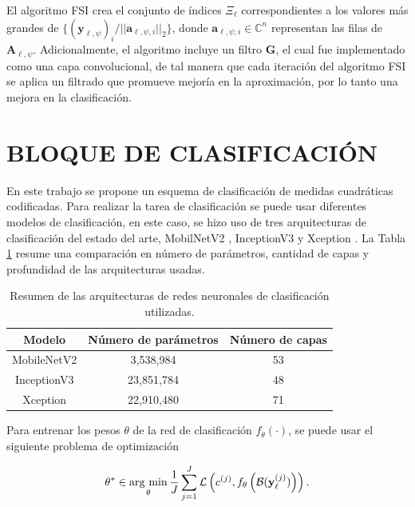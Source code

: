 El algoritmo FSI crea el conjunto de índices $\Xi_\ell$ correspondientes a los valores más grandes de $\{(\mathbf{y}_{\ell, \psi})_{i}/\vert \vert\mathbf{a}_{\ell, \psi,i}\vert \vert_2\}$, donde $\mathbf{a}_{\ell, \psi,i}\in\mathbb{C}^{n}$ representan las filas de $\mathbf{A}_{\ell, \psi}$. Adicionalmente, el algoritmo incluye un filtro $\mathbf{G}$, el cual fue implementado como una capa convolucional, de tal manera que cada iteración del algoritmo FSI se aplica un filtrado que promueve mejoría en la aproximación, por lo tanto una mejora en la clasificación. 


\section{BLOQUE DE CLASIFICACIÓN}

En este trabajo se propone un esquema de clasificación de medidas cuadráticas codificadas. Para realizar la tarea de clasificación se puede usar diferentes modelos de clasificación, en este caso, se hizo uso de tres arquitecturas de clasificación del estado del arte, MobilNetV2 , InceptionV3   y Xception . La Tabla \ref{tab:comp_class_models} resume una comparación en número de parámetros, cantidad de capas y profundidad de las arquitecturas usadas.

\begin{table}[!h]
\centering
\begin{tabular}{|c|c|c|}
\hline
\textbf{Modelo}      & \textbf{Número de parámetros} & \textbf{Número de capas} \\ \hline
MobileNetV2 & 3,538,984            & 53              \\ \hline
InceptionV3 & 23,851,784           & 48              \\ \hline
Xception    & 22,910,480           & 71              \\ \hline
\end{tabular}
\caption{Resumen de las arquitecturas de redes neuronales de clasificación utilizadas.}
\label{tab:comp_class_models}
\end{table}

Para entrenar los pesos $\theta$ de la red de clasificación $f_\theta(\cdot)$, se puede usar el siguiente problema de optimización

\begin{equation}
    \mathbf{\theta}^* \in  \operatorname*{arg \ min}_{\mathbf{\theta}} \frac{1}{J}\sum_{j = 1}^{J} \mathcal{L}\left( c^{(j)}, f_{\mathbf{\theta}}\left(\mathcal{B}(\mathbf{y}_{\ell}^{(j)})\right)\right).
    \label{eq:dl_optimization}
\end{equation}

